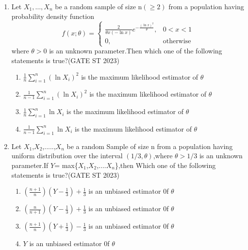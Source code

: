 \documentclass[journal]{IEEEtran}
\begin{document}
\begin{enumerate}[label=\textbf{Q.\arabic*.}, start=1, align=left, itemsep=2em]
\begin{enumerate}[label=\textbf{Q.\arabic*.}, start=11, align=left, itemsep=2em]
\item Let $X_1,\dots,X_n$ be a random sample of size n$(\geq 2)$ from a population having probability density function
\[ f(x;\theta) = \begin{cases}
\frac{2}{\theta x (-\ln x)} e^{ - \frac{(\ln x)^2}{\theta}}, & 0 < x < 1 \\
0, & \text{otherwise}
\end{cases} \]
where $\theta >0$ is an unknown parameter.Then which one of the following statements is true?\hfill(GATE ST 2023)  
\begin{enumerate}[label=(\Alph*)]
    \item $\frac{1}{n} \sum_{i=1}^n (\ln X_i)^2$ is the maximum likelihood estimator of $\theta$  
    \item $\frac{1}{n-1} \sum_{i=1}^n (\ln X_i)^2$ is the maximum likelihood estimator of $\theta$   
    \item $\frac{1}{n} \sum_{i=1}^n \ln X_i$ is the maximum likelihood estimator of $\theta$    
    \item $\frac{1}{n-1} \sum_{i=1}^n \ln X_i$ is the maximum likelihood estimator of $\theta$   
\end{enumerate}

\item Let $X_1$,$X_2$,.....,$X_n$ be a random Sample of size n from a population having uniform distribution over the interval $(1/3,\theta)$,where $\theta>1/3$ is an unknown parameter.If $Y$= max\{$X_1$,$X_2$,....$X_n$\},then Which one of the following statements is true?\hfill(GATE ST 2023)  
\begin{enumerate}[label=(\Alph*)]
    \item $\left( \frac{n+1}{n} \right) (Y - \frac13) + \frac13$ is an unbiased estimator 0f $\theta$  
     \item $\left( \frac{n}{n+1} \right) (Y - \frac13) + \frac13$  is an unbiased estimator 0f $\theta$  
    \item $\left( \frac{n+1}{n} \right) (Y + \frac13) - \frac13$ is an unbiased estimator 0f $\theta$   
    \item $Y$ is an unbiased estimator 0f $\theta$  
\end{enumerate}


\end{enumerate}
\end{enumerate}
\end{document}
